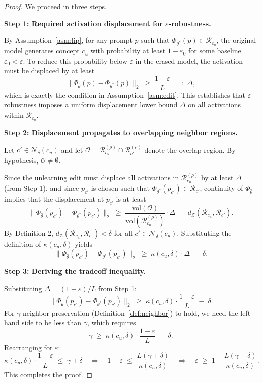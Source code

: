 \begin{proof}
We proceed in three steps.

\medskip
\noindent\textbf{Step 1: Required activation displacement for
$\varepsilon$-robustness.}

By Assumption~\ref{asm:lip}, for any prompt $p$ such that
$\Phi_{\theta^*}(p) \in \mathcal{R}_{c_u}$, the original model
generates concept $c_u$ with probability at least $1 - \varepsilon_0$
for some baseline $\varepsilon_0 < \varepsilon$. To reduce this
probability below $\varepsilon$ in the erased model, the activation
must be displaced by at least
\[
    \bigl\|\Phi_{\hat\theta}(p) - \Phi_{\theta^*}(p)\bigr\|_2
    \;\geq\; \frac{1 - \varepsilon}{L} \;=:\; \Delta,
\]
which is exactly the condition in Assumption~\ref{asm:edit}. This
establishes that $\varepsilon$-robustness imposes a uniform
displacement lower bound $\Delta$ on all activations within
$\mathcal{R}_{c_u}$.

\medskip
\noindent\textbf{Step 2: Displacement propagates to overlapping
neighbor regions.}

Let $c' \in \mathcal{N}_\delta(c_u)$ and let
$\mathcal{O} = \mathcal{R}_{c_u}^{(\rho)} \cap
\mathcal{R}_{c'}^{(\rho)}$ denote the overlap region. By hypothesis,
$\mathcal{O} \neq \emptyset$.

Since the unlearning edit must displace all activations in
$\mathcal{R}_{c_u}^{(\rho)}$ by at least $\Delta$ (from Step 1), and
since $p_{c'}$ is chosen such that
$\Phi_{\theta^*}(p_{c'}) \in \mathcal{R}_{c'}$, continuity of
$\Phi_{\hat\theta}$ implies that the displacement at $p_{c'}$ is
at least
\[
    \bigl\|\Phi_{\hat\theta}(p_{c'}) - \Phi_{\theta^*}(p_{c'})
    \bigr\|_2
    \;\geq\;
    \frac{\mathrm{vol}(\mathcal{O})}{\mathrm{vol}(\mathcal{R}_{c_u}^{(\rho)})}
    \cdot \Delta \;-\; d_\mathcal{Z}(\mathcal{R}_{c_u}, \mathcal{R}_{c'}).
\]
By Definition 2, $d_\mathcal{Z}(\mathcal{R}_{c_u},\mathcal{R}_{c'})
< \delta$ for all $c' \in \mathcal{N}_\delta(c_u)$. Substituting the
definition of $\kappa(c_u,\delta)$ yields
\[
    \bigl\|\Phi_{\hat\theta}(p_{c'}) - \Phi_{\theta^*}(p_{c'})
    \bigr\|_2
    \;\geq\;
    \kappa(c_u,\delta) \cdot \Delta \;-\; \delta.
\]

\medskip
\noindent\textbf{Step 3: Deriving the tradeoff inequality.}

Substituting $\Delta = (1-\varepsilon)/L$ from Step 1:
\[
    \bigl\|\Phi_{\hat\theta}(p_{c'}) - \Phi_{\theta^*}(p_{c'})
    \bigr\|_2
    \;\geq\;
    \kappa(c_u,\delta) \cdot \frac{1-\varepsilon}{L} \;-\; \delta.
\]
For $\gamma$-neighbor preservation (Definition~\ref{def:neighbor})
to hold, we need the left-hand side to be less than $\gamma$, which
requires
\[
    \gamma \;\geq\;
    \kappa(c_u,\delta) \cdot \frac{1-\varepsilon}{L} \;-\; \delta.
\]
Rearranging for $\varepsilon$:
\[
    \kappa(c_u,\delta) \cdot \frac{1-\varepsilon}{L}
    \;\leq\; \gamma + \delta
    \quad\Longrightarrow\quad
    1 - \varepsilon \;\leq\;
    \frac{L(\gamma+\delta)}{\kappa(c_u,\delta)}
    \quad\Longrightarrow\quad
    \varepsilon \;\geq\;
    1 - \frac{L(\gamma+\delta)}{\kappa(c_u,\delta)}.
\]
This completes the proof.
\end{proof}

